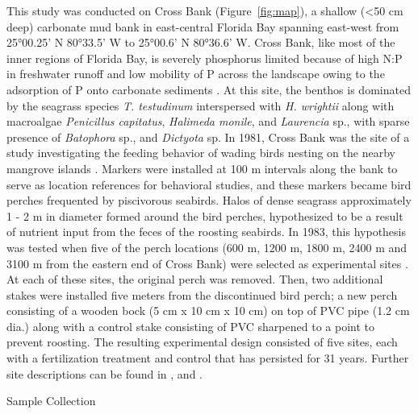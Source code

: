 This study was conducted on Cross Bank (Figure~\ref{fig:map}), a shallow (<50 cm deep) carbonate mud bank in east-central Florida Bay spanning east-west from 25°00.25’ N 80°33.5’ W to 25°00.6’ N 80°36.6’ W. Cross Bank, like most of the inner regions of Florida Bay, is severely phosphorus limited  because of high N:P in freshwater runoff and low mobility of P across the landscape owing to the adsorption of P onto carbonate sediments \citep{Powell:1989tt, Powell:1991va, Fourqurean:1992we, Fourqurean:1995uj, Herbert:2008di}.  At this site, the benthos is dominated by the seagrass species \textit{T. testudinum} interspersed with \textit{H. wrightii} along with macroalgae \textit{Penicillus capitatus}, \textit{Halimeda monile}, and \textit{Laurencia} sp., with sparse presence of \textit{Batophora} sp., and \textit{Dictyota} sp. In 1981, Cross Bank was the site of a study investigating the feeding behavior of wading birds nesting on the nearby mangrove islands \citep{Powell:1985uy}. Markers were installed at 100 m intervals along the bank to serve as location references for behavioral studies, and these markers became bird perches frequented by piscivorous seabirds. Halos of dense seagrass approximately 1 - 2 m in diameter formed around the bird perches, hypothesized to be a result of nutrient input from the feces of the roosting seabirds. In 1983, this hypothesis was tested when five of the perch locations (600 m, 1200 m, 1800 m, 2400 m and 3100 m from the eastern end of Cross Bank) were selected as experimental sites \citep{Powell:1989tt}. At each of these sites, the original perch was removed. Then, two additional stakes were installed five meters from the discontinued bird perch; a new perch consisting of a wooden bock (5 cm x 10 cm x 10 cm) on top of PVC pipe (1.2 cm dia.) along with a control stake consisting of PVC sharpened to a point to prevent roosting. The resulting experimental design consisted of five sites, each with a fertilization treatment and control that has persisted for 31 years. Further site descriptions can be found in \citet{Powell:1989tt}, \citet{Fourqurean:1995uj} and \citet{Ferguson:2008fd}.

\bigskip
\noindent Sample Collection
\medskip

